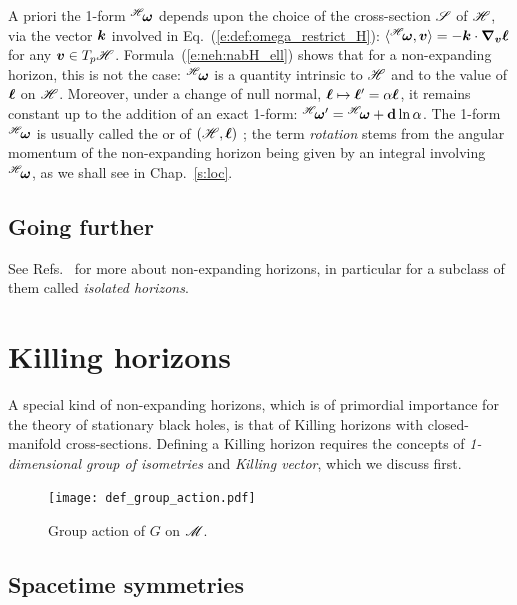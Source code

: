 A priori the 1-form ${}^{\mathscr{H}}\!\bm{\omega}$ depends upon the choice of the cross-section $\mathscr{S}$
of $\mathscr{H}$, via the vector $\bm{k}$ involved in Eq.~(\ref{e:def:omega_restrict_H}):
$\langle {}^{\mathscr{H}}\!\bm{\omega}, \bm{v} \rangle = - \bm{k} \cdot\bm{\nabla}_{\bm{v}} \bm{\ell}$
for any $\bm{v}\in T_p\mathscr{H}$. Formula~(\ref{e:neh:nabH_ell}) shows that for a non-expanding
horizon, this is not the case: ${}^{\mathscr{H}}\!\bm{\omega}$ is  a quantity intrinsic to $\mathscr{H}$ and to the value of $\bm{\ell}$ on $\mathscr{H}$.
Moreover, under a change of null normal, $\bm{\ell} \mapsto \bm{\ell}' = \alpha \bm{\ell}$,
it remains constant up to the addition of an exact 1-form:
${}^{\mathscr{H}}\!\bm{\omega}' = {}^{\mathscr{H}}\!\bm{\omega} + \mathbf{d}\ln\alpha$.
The 1-form ${}^{\mathscr{H}}\!\bm{\omega}$
is usually called the 
or 
of $(\mathscr{H}, \bm{\ell})$ \cite{AshteBL02,GourgJ06}; the term \emph{rotation}
stems from the angular momentum of the non-expanding horizon
being given by an integral involving ${}^{\mathscr{H}}\!\bm{\omega}$, as we shall see
in Chap.~\ref{s:loc}.

\subsection{Going further}

See Refs.~\cite{AshteK04,GourgJ06,Jaram13} for more
about non-expanding horizons, in particular for a subclass of them
called \emph{isolated horizons}.



\section{Killing horizons} \label{s:neh:Killing_hor}

A special kind of non-expanding horizons, which is of primordial
importance for the theory of
stationary black holes, is that of Killing horizons with closed-manifold cross-sections.
Defining a Killing horizon requires the concepts of \emph{1-dimensional group of
isometries} and \emph{Killing vector}, which we discuss first.

\begin{figure}
\centerline{\texttt{[image: def\_group\_action.pdf]}}
\caption[]{\label{f:neh:group_action} \footnotesize
Group action of $G$ on $\mathscr{M}$.}
\end{figure}


\subsection{Spacetime symmetries} \label{s:neh:symmetries}

